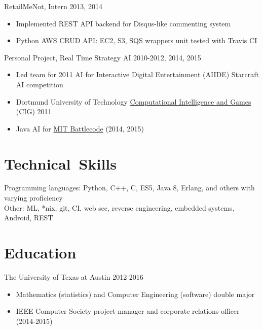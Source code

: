 \documentclass[line,margin]{res}
\begin{document}
\begin{resume}
    \vspace{-8pt}
    RetailMeNot, Intern
    \hfill  2013, 2014
        \begin{itemize} \itemsep -2pt
        \item Implemented REST API backend for Disqus-like commenting system
        \item Python AWS CRUD API: EC2, S3, SQS wrappers unit tested with Travis CI
        \end{itemize}

    \vspace{-8pt}
    Personal Project, Real Time Strategy AI 
    \hfill  2010-2012, 2014, 2015
        \begin{itemize} \itemsep -2pt
        \item Led team for 2011 AI for Interactive Digital Entertainment (AIIDE) Starcraft AI competition  
        \item Dortmund University of Technology \href{http://ls11-www.cs.tu-dortmund.de/rts-competition/starcraft-cig2011}{Computational Intelligence and Games (CIG)} 2011
        \item Java AI for \href{http://www.battlecode.org/}{MIT Battlecode} (2014, 2015)
        \end{itemize}


\vspace{-8pt}
\section{\mbox{Technical Skills}}
    \vspace{12pt} 
    Programming languages: Python, C++, C, ES5, Java 8, Erlang, and others with varying proficiency\\ 
    Other: ML, *nix, git, CI, web sec, reverse engineering, embedded systems, Android, REST


\vspace{-8pt}
\section{Education} 
    \vspace{12pt}
    The University of Texas at Austin \hfill 2012-2016 \\
    \vspace{-12pt}
        \begin{itemize} \itemsep -2pt
        \item Mathematics (statistics) and Computer Engineering (software) double major
        \item IEEE Computer Society project manager and corporate relations officer (2014-2015)
        \end{itemize}
     

\end{resume}
\end{document}
